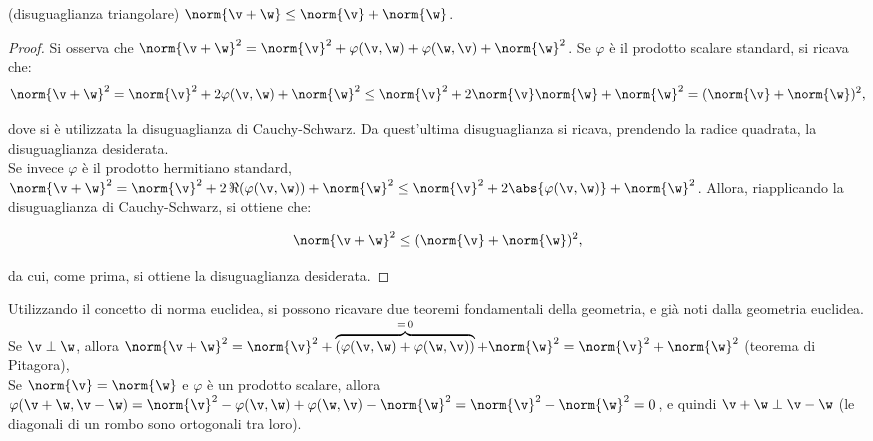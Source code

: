 \documentclass[11pt]{article}
\begin{document}
	\begin{proposition} (disuguaglianza triangolare)
		$\norm{\v + \w} \leq \norm{\v} + \norm{\w}$.
	\end{proposition}

	\begin{proof}
		Si osserva che $\norm{\v + \w}^2 = \norm{\v}^2 + \varphi(\v, \w) + \varphi(\w, \v) + \norm{\w}^2$.
		Se $\varphi$ è il prodotto scalare standard, si ricava che:
		\[ \norm{\v + \w}^2 = \norm{\v}^2 + 2 \varphi(\v, \w) + \norm{\w}^2
		\leq \norm{\v}^2 + 2 \norm{\v} \norm{\w} + \norm{\w}^2 =
		(\norm{\v} + \norm{\w})^2,\]
		
		dove si è utilizzata la disuguaglianza di Cauchy-Schwarz. Da quest'ultima disuguaglianza si ricava, prendendo la radice quadrata, la disuguaglianza
		desiderata. \\
		
		Se invece $\varphi$ è il prodotto hermitiano standard, $\norm{\v + \w}^2 = \norm{\v}^2 + 2 \, \Re(\varphi(\v, \w)) + \norm{\w}^2 \leq \norm{\v}^2 + 2 \abs{\varphi(\v, \w)} + \norm{\w}^2$. Allora, riapplicando
		la disuguaglianza di Cauchy-Schwarz, si ottiene che:
		
		\[ \norm{\v + \w}^2 \leq (\norm{\v} + \norm{\w})^2, \]
		
		da cui, come prima, si ottiene la disuguaglianza desiderata.
	\end{proof}

	\begin{remark}
		Utilizzando il concetto di norma euclidea, si possono ricavare due teoremi fondamentali della geometria,
		e già noti dalla geometria euclidea. \\
		
		\li Se $\v \perp \w$, allora $\norm{\v + \w}^2 = \norm{\v}^2 + \overbrace{(\varphi(\v, \w) + \varphi(\w, \v))}^{=\,0} + \norm{\w}^2 = \norm{\v}^2 + \norm{\w}^2$ (teorema di Pitagora), \\
		\li Se $\norm{\v} = \norm{\w}$ e $\varphi$ è un prodotto scalare, allora $\varphi(\v + \w, \v - \w) = \norm{\v}^2 - \varphi(\v, \w) + \varphi(\w, \v) - \norm{\w}^2  = \norm{\v}^2 - \norm{\w}^2 = 0$, e quindi
		$\v + \w \perp \v - \w$ (le diagonali di un rombo sono ortogonali tra loro).
	\end{remark}
\end{document}
